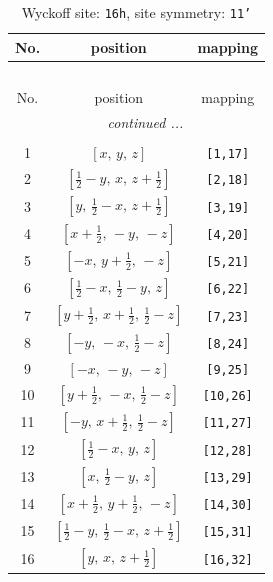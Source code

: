 \documentclass[fleqn,8pt]{jsarticle}
\begin{document}
\begin{longtable}{ccc}
\caption{Wyckoff site: {\tt 16h}, site symmetry: {\tt 11'}}
 \\
 \hline \hline
No. & position & mapping \\ \hline \endfirsthead

\multicolumn{2}{l}{\tablename\ \thetable{}} \\
 \hline \hline
No. & position & mapping \\ \hline \endhead

 \hline \hline
\multicolumn{2}{r}{\footnotesize\it continued ...} \\ \endfoot

 \hline \hline
\multicolumn{2}{r}{} \\ \endlastfoot

1 & $\left[ x,\, y,\, z \right]$ & {\tt [1,17]} \\ \hline
2 & $\left[ \frac{1}{2} - y,\, x,\, z + \frac{1}{2} \right]$ & {\tt [2,18]} \\ \hline
3 & $\left[ y,\, \frac{1}{2} - x,\, z + \frac{1}{2} \right]$ & {\tt [3,19]} \\ \hline
4 & $\left[ x + \frac{1}{2},\, - y,\, - z \right]$ & {\tt [4,20]} \\ \hline
5 & $\left[ - x,\, y + \frac{1}{2},\, - z \right]$ & {\tt [5,21]} \\ \hline
6 & $\left[ \frac{1}{2} - x,\, \frac{1}{2} - y,\, z \right]$ & {\tt [6,22]} \\ \hline
7 & $\left[ y + \frac{1}{2},\, x + \frac{1}{2},\, \frac{1}{2} - z \right]$ & {\tt [7,23]} \\ \hline
8 & $\left[ - y,\, - x,\, \frac{1}{2} - z \right]$ & {\tt [8,24]} \\ \hline
9 & $\left[ - x,\, - y,\, - z \right]$ & {\tt [9,25]} \\ \hline
10 & $\left[ y + \frac{1}{2},\, - x,\, \frac{1}{2} - z \right]$ & {\tt [10,26]} \\ \hline
11 & $\left[ - y,\, x + \frac{1}{2},\, \frac{1}{2} - z \right]$ & {\tt [11,27]} \\ \hline
12 & $\left[ \frac{1}{2} - x,\, y,\, z \right]$ & {\tt [12,28]} \\ \hline
13 & $\left[ x,\, \frac{1}{2} - y,\, z \right]$ & {\tt [13,29]} \\ \hline
14 & $\left[ x + \frac{1}{2},\, y + \frac{1}{2},\, - z \right]$ & {\tt [14,30]} \\ \hline
15 & $\left[ \frac{1}{2} - y,\, \frac{1}{2} - x,\, z + \frac{1}{2} \right]$ & {\tt [15,31]} \\ \hline
16 & $\left[ y,\, x,\, z + \frac{1}{2} \right]$ & {\tt [16,32]} \\
\end{longtable}
\end{document}
